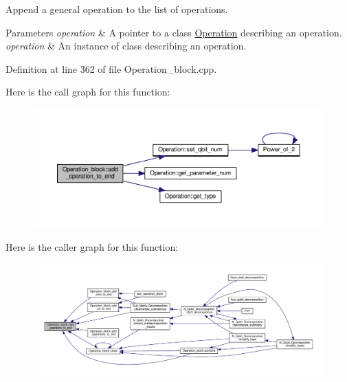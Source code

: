 Append a general operation to the list of operations. 


\begin{DoxyParams}{Parameters}
{\em operation} & A pointer to a class \hyperlink{class_operation}{Operation} describing an operation.\\
\hline
{\em operation} & An instance of class  describing an operation. \\
\hline
\end{DoxyParams}


Definition at line 362 of file Operation\+\_\+block.\+cpp.



Here is the call graph for this function\+:
\nopagebreak
\begin{figure}[H]
\begin{center}
\leavevmode
\includegraphics[width=350pt]{class_operation__block_a0048efcfca374a6b960a1092ab564f03_cgraph}
\end{center}
\end{figure}




Here is the caller graph for this function\+:
\nopagebreak
\begin{figure}[H]
\begin{center}
\leavevmode
\includegraphics[width=350pt]{class_operation__block_a0048efcfca374a6b960a1092ab564f03_icgraph}
\end{center}
\end{figure}


